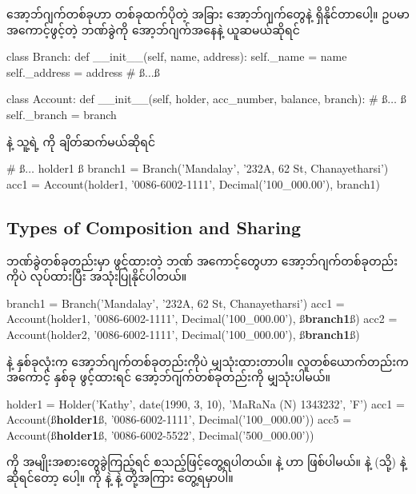 အော့ဘ်ဂျက်တစ်ခုဟာ တစ်ခုထက်ပိုတဲ့ အခြား အော့ဘ်ဂျက်တွေနဲ့  ရှိနိုင်တာပေါ့။ ဥပမာ အကောင့်ဖွင့်တဲ့ ဘဏ်ခွဲကို အော့ဘ်ဂျက်အနေနဲ့ ယူဆမယ်ဆိုရင် 
%
\begin{py}
class Branch:
    def __init__(self, name, address):
        self._name = name
        self._address = address
    # ß$\ldots$ß

class Account:
    def __init__(self, holder, acc_number, balance, branch):
        # ß$\ldots$ ß
        self._branch = branch
\end{py}
%
 နဲ့ သူ့ရဲ့  ကို ချိတ်ဆက်မယ်ဆိုရင်
%
\begin{py}
# ß$\ldots$ holder1 ß
branch1 = Branch('Mandalay', '232A, 62 St, Chanayetharsi')
acc1 = Account(holder1, 
               '0086-6002-1111', 
               Decimal('100_000.00'), 
               branch1)
\end{py}
%

\subsection*{Types of Composition and Sharing}
ဘဏ်ခွဲတစ်ခုတည်းမှာ ဖွင့်ထားတဲ့ ဘဏ် အကောင့်တွေဟာ  အော့ဘ်ဂျက်တစ်ခုတည်းကိုပဲ  လုပ်ထားပြီး အသုံးပြုနိုင်ပါတယ်။
%
\begin{py}
branch1 = Branch('Mandalay', '232A, 62 St, Chanayetharsi')
acc1 = Account(holder1, 
               '0086-6002-1111', 
               Decimal('100_000.00'), 
               ß\textbf{branch1}ß)
acc2 = Account(holder2, 
               '0086-6002-1111', 
               Decimal('100_000.00'), 
               ß\textbf{branch1}ß)
\end{py}
%
 နဲ့  နှစ်ခုလုံးက  ‌အော့ဘ်ဂျက်တစ်ခုတည်းကိုပဲ မျှသုံးထားတာပါ။ လူတစ်ယောက်\allowbreak တည်းက အကောင့် နှစ်ခု ဖွင့်ထားရင်  အော့ဘ်ဂျက်တစ်ခုတည်းကို မျှသုံးပါမယ်။

%
\begin{py}
holder1 = Holder('Kathy',
    date(1990, 3, 10),
    'MaRaNa (N) 1343232',
    'F')
acc1 = Account(ß\textbf{holder1}ß, '0086-6002-1111', Decimal('100_000.00'))
acc5 = Account(ß\textbf{holder1}ß, '0086-6002-5522', Decimal('500_000.00'))
\end{py}
%

 ကို အမျိုးအစားတွေခွဲကြည့်ရင်  စသည့်ဖြင့်တွေ့ရပါတယ်။  နဲ့  ဟာ  ဖြစ်ပါမယ်။  နဲ့  (သို့)  နဲ့  ဆိုရင်တော့  ပေါ့။  ကို  နဲ့ \fEn{,}  နဲ့  တို့အကြား တွေ့ရမှာပါ။ 


